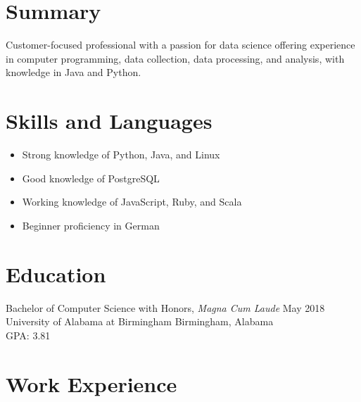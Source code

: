 \documentclass[10pt]{setzerresume}
\begin{document}


  \section{Summary}
  Customer-focused professional with a passion for data science offering experience in computer programming, data collection, data processing, and analysis, with knowledge in Java and Python.

  \section{Skills and Languages}

  \begin{itemize}[nosep]
    \item Strong knowledge of Python, Java, and Linux
    \item Good knowledge of PostgreSQL
    \item Working knowledge of JavaScript, Ruby, and Scala
    \item Beginner proficiency in German
  \end{itemize}

  \section{Education}
  Bachelor of Computer Science with Honors, \textit{Magna Cum Laude} \hfill May 2018 \\
  University of Alabama at Birmingham \hfill Birmingham, Alabama \\
  GPA\@: 3.81


  \section{Work Experience}

\end{document}
